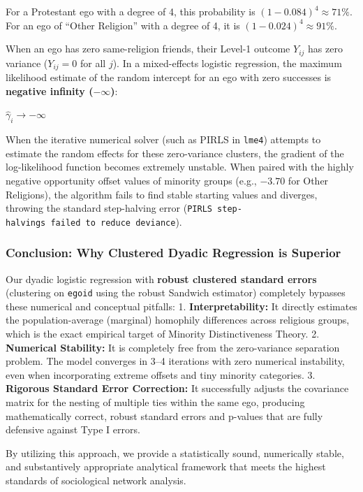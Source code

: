 \documentclass[
  letterpaper,
  DIV=11,
  numbers=noendperiod]{scrartcl}
\begin{document}
For a Protestant ego with a degree of 4, this probability is
\((1 - 0.084)^4 \approx 71\%\). For an ego of ``Other Religion'' with a
degree of 4, it is \((1 - 0.024)^4 \approx 91\%\).

When an ego has zero same-religion friends, their Level-1 outcome
\(Y_{ij}\) has zero variance (\(Y_{ij} = 0\) for all \(j\)). In a
mixed-effects logistic regression, the maximum likelihood estimate of
the random intercept for an ego with zero successes is \textbf{negative
infinity (\(-\infty\))}:

\(\hat{\gamma}_i \to -\infty\)

When the iterative numerical solver (such as PIRLS in \texttt{lme4})
attempts to estimate the random effects for these zero-variance
clusters, the gradient of the log-likelihood function becomes extremely
unstable. When paired with the highly negative opportunity offset values
of minority groups (e.g., \(-3.70\) for Other Religions), the algorithm
fails to find stable starting values and diverges, throwing the standard
step-halving error
(\texttt{PIRLS\ step-halvings\ failed\ to\ reduce\ deviance}).

\subsubsection{Conclusion: Why Clustered Dyadic Regression is
Superior}\label{conclusion-why-clustered-dyadic-regression-is-superior}

Our dyadic logistic regression with \textbf{robust clustered standard
errors} (clustering on \texttt{egoid} using the robust Sandwich
estimator) completely bypasses these numerical and conceptual pitfalls:
1. \textbf{Interpretability:} It directly estimates the
population-average (marginal) homophily differences across religious
groups, which is the exact empirical target of Minority Distinctiveness
Theory. 2. \textbf{Numerical Stability:} It is completely free from the
zero-variance separation problem. The model converges in 3--4 iterations
with zero numerical instability, even when incorporating extreme offsets
and tiny minority categories. 3. \textbf{Rigorous Standard Error
Correction:} It successfully adjusts the covariance matrix for the
nesting of multiple ties within the same ego, producing mathematically
correct, robust standard errors and p-values that are fully defensive
against Type I errors.

By utilizing this approach, we provide a statistically sound,
numerically stable, and substantively appropriate analytical framework
that meets the highest standards of sociological network analysis.
\end{document}
